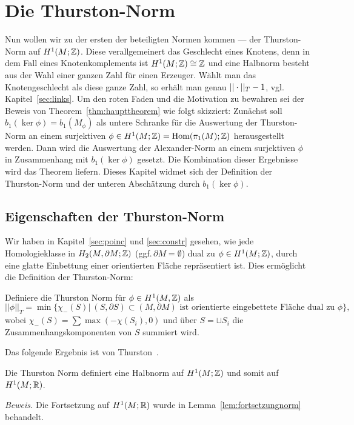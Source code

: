 
\section{Die Thurston-Norm}
	
	Nun wollen wir zu der ersten der beteiligten Normen kommen --- der Thurston-Norm auf $H^1(M;\mathbb{Z})$. Diese verallgemeinert das Geschlecht eines Knotens, denn in dem Fall eines Knotenkomplements ist $H^1(M;\mathbb{Z})\cong \mathbb{Z}$ und eine Halbnorm besteht aus der Wahl einer ganzen Zahl für einen Erzeuger. Wählt man das Knotengeschlecht als diese ganze Zahl, so erhält man genau $||\cdot||_T -1$, vgl.\,Kapitel~\ref{sec:links}. Um den roten Faden und die Motivation zu bewahren sei der Beweis von Theorem~\ref{thm:haupttheorem} wie folgt skizziert: Zunächst soll $b_1(\ker\phi)=b_1(M_\phi)$ als untere Schranke für die Auswertung der Thurston-Norm an einem surjektiven $\phi \in H^1(M;\mathbb{Z}) = \operatorname{Hom} (\pi_1(M);\mathbb{Z})$ herausgestellt werden. Dann wird die Auswertung der Alexander-Norm an einem surjektiven $\phi$ in Zusammenhang mit $b_1(\ker\phi)$ gesetzt. Die Kombination dieser Ergebnisse wird das Theorem liefern. Dieses Kapitel widmet sich der Definition der Thurston-Norm und der unteren Abschätzung durch $b_1(\ker\phi)$.

	\subsection{Eigenschaften der Thurston-Norm}

        Wir haben in Kapitel~\ref{sec:poinc} und \ref{sec:constr} gesehen, wie jede Homologieklasse in $H_2(M,\partial M;\mathbb{Z})$ (ggf.\,$\partial M=\emptyset$) dual zu $\phi \in H^1(M;\mathbb{Z})$, durch eine glatte Einbettung einer orientierten Fläche repräsentiert ist. Dies  ermöglicht die Definition der Thurston-Norm:
        \begin{defn}
        	Definiere die Thurston Norm für $\phi \in H^1(M,\mathbb{Z})$ als
        	\[
        	        		||\phi||_T = \min\{ \chi_-(S)| ~(S,\partial S) \subset (M,\partial M)\text{ ist orientierte eingebettete Fläche dual zu } \phi \},
        	        	\]        	
        	wobei $\chi_-(S)=\sum \max (-\chi(S_i),0)$ und über $S=\sqcup S_i$ die Zusammenhangskomponenten von $S$ summiert wird.
        \end{defn}
        
        Das folgende Ergebnis ist von Thurston~\cite{Thurston.1986}.
        \begin{lem}
        \label{lem:norm}
        	Die Thurston Norm definiert eine Halbnorm auf $H^1(M;\mathbb{Z})$ und somit auf $H^1(M;\mathbb{R})$. 
        \end{lem}
          \noindent\textit{Beweis.}
          Die Fortsetzung auf $H^1(M;\mathbb{R})$ wurde in Lemma~\ref{lem:fortsetzungnorm} behandelt.

